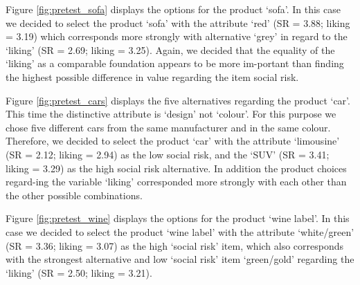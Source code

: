 Figure \ref{fig:pretest_sofa} displays the options for the product ‘sofa’. In this case we decided to select the product ‘sofa’ with the attribute ‘red’ (SR = 3.88; liking = 3.19) which corresponds more strongly with alternative ‘grey’ in regard to the ‘liking’ (SR = 2.69; liking = 3.25). Again, we decided that the equality of the ‘liking’ as a comparable foundation appears to be more im-portant than finding the highest possible difference in value regarding the item social risk. \par
Figure \ref{fig:pretest_cars} displays the five alternatives regarding the product ‘car’. This time the distinctive attribute is ‘design’ not ‘colour’. For this purpose we chose five different cars from the same manufacturer and in the same colour. Therefore, we decided to select the product ‘car’ with the attribute ‘limousine’ (SR = 2.12; liking = 2.94) as the low social risk, and the ‘SUV’ (SR =  3.41; liking = 3.29) as the high social risk alternative. In addition the product choices regard-ing the variable ‘liking’ corresponded more strongly with each other than the other possible combinations.\par
Figure \ref{fig:pretest_wine} displays the options for the product ‘wine label’. In this case we decided to select the product ‘wine label’ with the attribute ‘white/green’ (SR = 3.36; liking = 3.07) as the high ‘social risk’ item, which also corresponds with the strongest alternative and low ‘social risk’ item ‘green/gold’ regarding the ‘liking’ (SR =  2.50; liking = 3.21). \par

